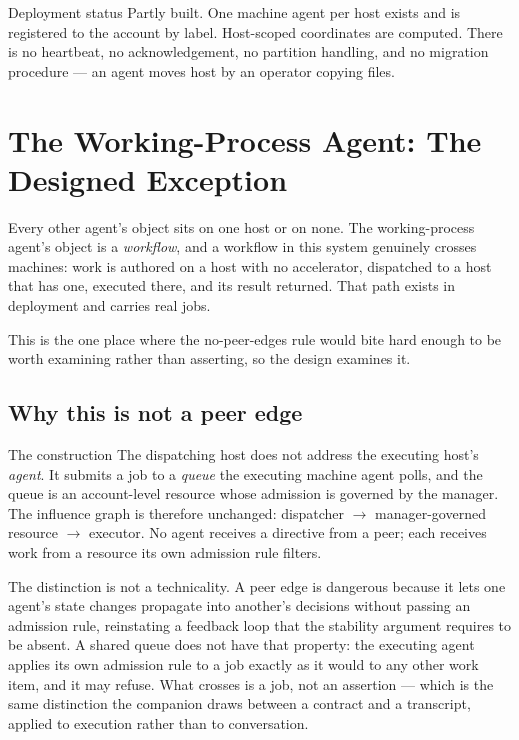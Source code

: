 \documentclass[11pt]{article}
\begin{document}
\begin{notebox}{Deployment status}
Partly built. One machine agent per host exists and is registered to the account by label. Host-scoped coordinates are computed. There is no heartbeat, no acknowledgement, no partition handling, and no migration procedure --- an agent moves host by an operator copying files.
\end{notebox}

\section{The Working-Process Agent: The Designed Exception}
\label{sec:process}

Every other agent's object sits on one host or on none. The working-process agent's object is a \emph{workflow}, and a workflow in this system genuinely crosses machines: work is authored on a host with no accelerator, dispatched to a host that has one, executed there, and its result returned. That path exists in deployment and carries real jobs.

This is the one place where the no-peer-edges rule would bite hard enough to be worth examining rather than asserting, so the design examines it.

\subsection{Why this is not a peer edge}

\begin{claimbox}{The construction}
The dispatching host does not address the executing host's \emph{agent}. It submits a job to a \emph{queue} the executing machine agent polls, and the queue is an account-level resource whose admission is governed by the manager. The influence graph is therefore unchanged: dispatcher $\rightarrow$ manager-governed resource $\rightarrow$ executor. No agent receives a directive from a peer; each receives work from a resource its own admission rule filters.
\end{claimbox}

The distinction is not a technicality. A peer edge is dangerous because it lets one agent's state changes propagate into another's decisions without passing an admission rule, reinstating a feedback loop that the stability argument requires to be absent. A shared queue does not have that property: the executing agent applies its own admission rule to a job exactly as it would to any other work item, and it may refuse. What crosses is a job, not an assertion --- which is the same distinction the companion draws between a contract and a transcript, applied to execution rather than to conversation.
\end{document}
